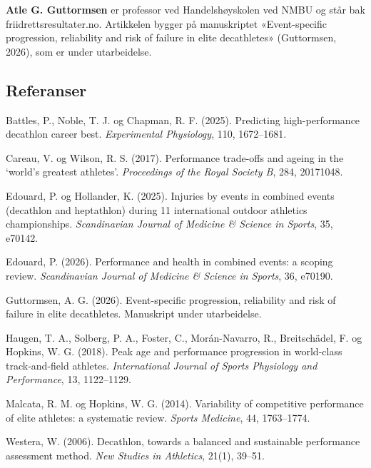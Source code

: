 \begin{forfatterboks}

\textbf{Atle G. Guttormsen} er professor ved Handelshøyskolen ved NMBU og står bak friidrettsresultater.no. Artikkelen bygger på manuskriptet «Event-specific progression, reliability and risk of failure in elite decathletes» (Guttormsen, 2026), som er under utarbeidelse.

\end{forfatterboks}

\subsection{Referanser}\label{referanser}

\begin{referanser}

Battles, P., Noble, T. J. og Chapman, R. F. (2025). Predicting high-performance decathlon career best. \emph{Experimental Physiology}, 110, 1672--1681.

Careau, V. og Wilson, R. S. (2017). Performance trade-offs and ageing in the `world's greatest athletes'. \emph{Proceedings of the Royal Society B}, 284, 20171048.

Edouard, P. og Hollander, K. (2025). Injuries by events in combined events (decathlon and heptathlon) during 11 international outdoor athletics championships. \emph{Scandinavian Journal of Medicine \& Science in Sports}, 35, e70142.

Edouard, P. (2026). Performance and health in combined events: a scoping review. \emph{Scandinavian Journal of Medicine \& Science in Sports}, 36, e70190.

Guttormsen, A. G. (2026). Event-specific progression, reliability and risk of failure in elite decathletes. Manuskript under utarbeidelse.

Haugen, T. A., Solberg, P. A., Foster, C., Morán-Navarro, R., Breitschädel, F. og Hopkins, W. G. (2018). Peak age and performance progression in world-class track-and-field athletes. \emph{International Journal of Sports Physiology and Performance}, 13, 1122--1129.

Malcata, R. M. og Hopkins, W. G. (2014). Variability of competitive performance of elite athletes: a systematic review. \emph{Sports Medicine}, 44, 1763--1774.

Westera, W. (2006). Decathlon, towards a balanced and sustainable performance assessment method. \emph{New Studies in Athletics}, 21(1), 39--51.

\end{referanser}
